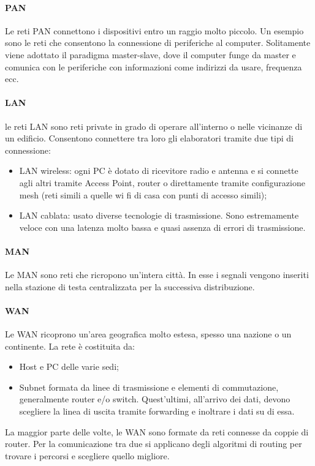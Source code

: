 \documentclass{subfiles}
\begin{document}
    \paragraph{PAN}
    Le reti PAN connettono i dispositivi entro un raggio molto piccolo. Un esempio sono le reti che consentono la connessione di 
    periferiche al computer. Solitamente viene adottato il paradigma master-slave, dove il computer funge da master e comunica con le 
    periferiche con informazioni come indirizzi da usare, frequenza ecc.

    \paragraph{LAN}
    le reti LAN sono reti private in grado di operare all'interno o nelle vicinanze di un edificio. Consentono connettere tra loro gli 
    elaboratori tramite due tipi di connessione:
    \begin{itemize}
        \item LAN wireless: ogni PC è dotato di ricevitore radio e antenna e si connette agli altri tramite Access Point, router o 
        direttamente tramite configurazione mesh (reti simili a quelle wi fi di casa con punti di accesso simili);
        \item LAN cablata: usato diverse tecnologie di trasmissione. Sono estremamente veloce con una latenza molto bassa e quasi 
        assenza di errori di trasmissione. 
    \end{itemize}

    \paragraph{MAN}
    Le MAN sono reti che ricropono un'intera città. In esse i segnali vengono inseriti nella stazione di testa centralizzata per la 
    successiva distribuzione.

    \paragraph{WAN}
    Le WAN ricoprono un'area geografica molto estesa, spesso una nazione o un continente. La rete è costituita da:
    \begin{itemize}
        \item Host e PC delle varie sedi;
        \item Subnet formata da linee di trasmissione e elementi di commutazione, generalmente router e/o switch. Quest'ultimi, 
        all'arrivo dei dati, devono scegliere la linea di uscita tramite forwarding e inoltrare i dati su di essa.
    \end{itemize}
    La maggior parte delle volte, le WAN sono formate da reti connesse da coppie di router. Per la comunicazione tra due si applicano 
    degli algoritmi di routing per trovare i percorsi e scegliere quello migliore.
\end{document}
